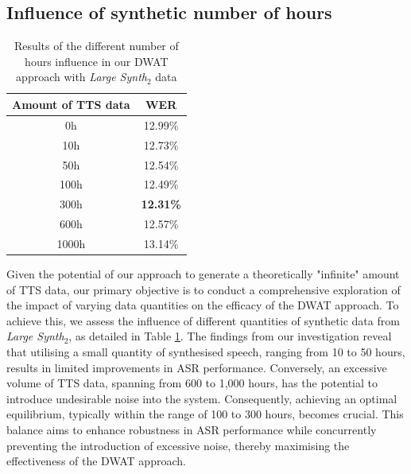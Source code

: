 \subsection{Influence of synthetic number of hours}
\begin{table}[t]
\centering
\begin{tabular}{cc}
\hline
 Amount of TTS data & WER    \\ \hline
\multicolumn{1}{c}{0h} & 12.99\% \\ \hline
\multicolumn{1}{c}{10h}  &   12.73\%   \\ 
\multicolumn{1}{c}{50h}    & 12.54\%   \\ 
\multicolumn{1}{c}{100h} & 12.49\%  \\ 
\multicolumn{1}{c}{300h} & \textbf{12.31\%}  \\ 
\multicolumn{1}{c}{600h} & 12.57\%  \\ 
\multicolumn{1}{c}{1000h} & 13.14\%  \\ \hline

\end{tabular}

\caption{Results of the different number of hours influence in our DWAT approach with \textit{Large Synth$_2$} data}
\label{tab:hours}
\end{table}

Given the potential of our approach to generate a theoretically "infinite" amount of TTS data, our primary objective is to conduct a comprehensive exploration of the impact of varying data quantities on the efficacy of the DWAT approach. To achieve this, we assess the influence of different quantities of synthetic data from \textit{Large Synth$_2$}, as detailed in Table \ref{tab:hours}.
The findings from our investigation reveal that utilising a small quantity of synthesised speech, ranging from 10 to 50 hours, results in limited improvements in ASR performance. Conversely, an excessive volume of TTS data, spanning from 600 to 1,000 hours, has the potential to introduce undesirable noise into the system. Consequently, achieving an optimal equilibrium, typically within the range of 100 to 300 hours, becomes crucial. This balance aims to enhance robustness in ASR performance while concurrently preventing the introduction of excessive noise, thereby maximising the effectiveness of the DWAT approach.
